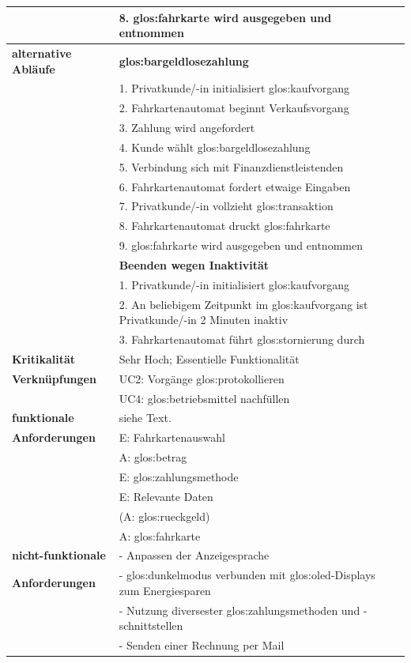 \documentclass{lastenheft}
\begin{document}
\begin{xltabular}{\linewidth}{|>{\bfseries}p{4cm}|X|}
    & 8. \gls{glos:fahrkarte} wird ausgegeben und entnommen \\
    \hline
    alternative Abläufe & \textbf{\gls{glos:bargeldlosezahlung}} \\
    & 1. Privatkunde/-in initialisiert \gls{glos:kaufvorgang} \\
    & 2. Fahrkartenautomat beginnt Verkaufsvorgang \\
    & 3. Zahlung wird angefordert \\
    & 4. Kunde wählt \gls{glos:bargeldlosezahlung} \\
    & 5. Verbindung sich mit Finanzdienstleistenden \\
    & 6. Fahrkartenautomat fordert etwaige Eingaben \\
    & 7. Privatkunde/-in vollzieht \gls{glos:transaktion} \\
    & 8. Fahrkartenautomat druckt \gls{glos:fahrkarte} \\
    & 9. \gls{glos:fahrkarte} wird ausgegeben und entnommen \\
    & \textbf{Beenden wegen Inaktivität} \\
    & 1. Privatkunde/-in initialisiert  \gls{glos:kaufvorgang} \\
    & 2. An beliebigem Zeitpunkt im \gls{glos:kaufvorgang} ist Privatkunde/-in 2 Minuten inaktiv \\
    & 3. Fahrkartenautomat führt \gls{glos:stornierung} durch \\
    \hline
    Kritikalität & Sehr Hoch; Essentielle Funktionalität\\
    \hline
    Verknüpfungen & UC2: Vorgänge \gls{glos:protokollieren} \\
    & UC4: \gls{glos:betriebsmittel} nachfüllen \\
    \hline
    funktionale & siehe Text.\\
    Anforderungen & E: Fahrkartenauswahl \\
    & A: \gls{glos:betrag} \\
    & E: \gls{glos:zahlungsmethode} \\
    & E: Relevante Daten \\
    & (A: \gls{glos:rueckgeld}) \\
    & A: \gls{glos:fahrkarte} \\
    \hline
    nicht-funktionale & - Anpassen der Anzeigesprache \\
    Anforderungen & - \gls{glos:dunkelmodus} verbunden mit \gls{glos:oled}-Displays zum Energiesparen \\
    & - Nutzung diversester \gls{glos:zahlungsmethode}n und -schnittstellen \\
    & - Senden einer Rechnung per Mail \\
    \hline
\end{xltabular}
\end{document}
